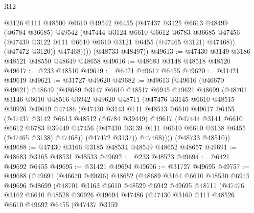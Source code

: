 \begin{lexlean}{R12}
\begin{coremodule}
              @3126
              @111
              @48500
              @6610
              @49542
              @6455
              (@47437
                @3125
                @6613
                @48499
                (@6784 @36685)
                @49542
                (@47444
                  @3124
                  @6610
                  @6612
                  @6783
                  @36685
                  @47456
                  (@47430 @3122 @111 @6610 @6610 @3121 @6455 (@47465 @3121) @47468))
                (@47472 @3120))
              @47468))))
      (@48733 @48497))
@49613 := @47430 @3149 @3186 @48521 @48550 @48649 @48658
@49616 := @48683 @3148 @48518 @48520
@49617 := @233 @48510
@49619 := @6421 @49617 @6455
@49620 := @31421 @49619
@49621 := @31727 @49620
@49682 := @49613
    (@49616
      (@46670 @49621)
      @48649
      (@48689
        @3147
        @6610
        @48517
        @6945
        @49621
        @48699
        (@48701
          @3146
          @6610
          @48516
          @6942
          @49620
          @48711
          (@47476
            @3145
            @6610
            @48515
            @30926
            @49619
            @47486
            (@47430
              @3143
              @111
              @48513
              @6610
              @49617
              @6455
              (@47437
                @3142
                @6613
                @48512
                (@6784 @39449)
                @49617
                (@47444
                  @3141
                  @6610
                  @6612
                  @6783
                  @39449
                  @47456
                  (@47430 @3139 @111 @6610 @6610 @3138 @6455 (@47465 @3138) @47468))
                (@47472 @3137))
              @47468))))
      (@48733 @48510))
@49688 := @47430 @3166 @3185 @48534 @48549 @48652 @48657
@49691 := @48683 @3165 @48531 @48533
@49692 := @233 @48523
@49694 := @6421 @49692 @6455
@49695 := @31421 @49694
@49696 := @31727 @49695
@49757 := @49688
    (@49691
      (@46670 @49696)
      @48652
      (@48689
        @3164
        @6610
        @48530
        @6945
        @49696
        @48699
        (@48701
          @3163
          @6610
          @48529
          @6942
          @49695
          @48711
          (@47476
            @3162
            @6610
            @48528
            @30926
            @49694
            @47486
            (@47430
              @3160
              @111
              @48526
              @6610
              @49692
              @6455
              (@47437
                @3159

\end{coremodule}
\end{lexlean}
